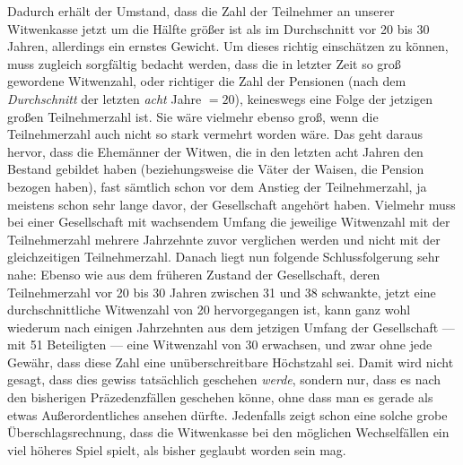 Dadurch erhält der Umstand, dass die Zahl der Teilnehmer an unserer Witwenkasse jetzt um die Hälfte größer ist als im Durchschnitt vor 20 bis 30 Jahren, allerdings ein ernstes Gewicht. Um dieses richtig einschätzen zu können, muss zugleich sorgfältig bedacht werden, dass die in letzter Zeit so groß gewordene Witwenzahl, oder richtiger die Zahl der Pensionen (nach dem \textit{Durchschnitt} der letzten \textit{acht} Jahre \(=20\)), keineswegs eine Folge der jetzigen großen Teilnehmerzahl ist. Sie wäre vielmehr ebenso groß, wenn die Teilnehmerzahl auch nicht so stark vermehrt worden wäre. Das geht daraus hervor, dass die Ehemänner der Witwen, die in den letzten acht Jahren den Bestand gebildet haben (beziehungsweise die Väter der Waisen, die Pension bezogen haben), fast sämtlich schon vor dem Anstieg der Teilnehmerzahl, ja meistens schon sehr lange davor, der Gesellschaft angehört haben. Vielmehr muss bei einer Gesellschaft mit wachsendem Umfang die jeweilige Witwenzahl mit der Teilnehmerzahl mehrere Jahrzehnte zuvor verglichen werden und nicht mit der gleichzeitigen Teilnehmerzahl. Danach liegt nun folgende Schlussfolgerung sehr nahe: Ebenso wie aus dem früheren Zustand der Gesellschaft, deren Teilnehmerzahl vor 20 bis 30 Jahren zwischen 31 und 38 schwankte, jetzt eine durchschnittliche Witwenzahl von 20 hervorgegangen ist, kann ganz wohl wiederum nach einigen Jahrzehnten aus dem jetzigen Umfang der Gesellschaft — mit 51 Beteiligten — eine Witwenzahl von 30 erwachsen, und zwar ohne jede Gewähr, dass diese Zahl eine unüberschreitbare Höchstzahl sei. Damit wird nicht gesagt, dass dies gewiss tatsächlich geschehen \textit{werde}, sondern nur, dass es nach den bisherigen Präzedenzfällen geschehen könne, ohne dass man es gerade als etwas Außerordentliches ansehen dürfte. Jedenfalls zeigt schon eine solche grobe Überschlagsrechnung, dass die Witwenkasse bei den möglichen Wechselfällen ein viel höheres Spiel spielt, als bisher geglaubt worden sein mag.
